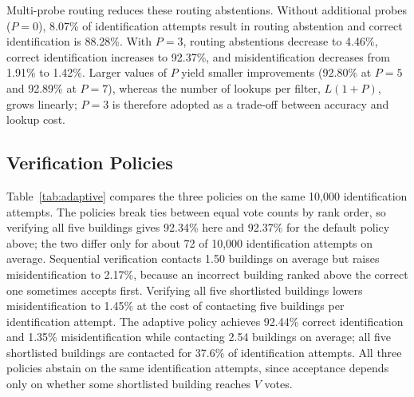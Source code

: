 \documentclass[pdflatex,sn-mathphys-num]{sn-jnl}%
\theoremstyle{thmstyleone}%
\theoremstyle{thmstyletwo}%
\theoremstyle{thmstylethree}%
\begin{document}
Multi-probe routing reduces these routing abstentions. Without additional probes ($P=0$), 8.07\% of identification attempts result in routing abstention and correct identification is 88.28\%. With $P=3$, routing abstentions decrease to 4.46\%, correct identification increases to 92.37\%, and misidentification decreases from 1.91\% to 1.42\%. Larger values of $P$ yield smaller improvements (92.80\% at $P=5$ and 92.89\% at $P=7$), whereas the number of lookups per filter, $L(1+P)$, grows linearly; $P=3$ is therefore adopted as a trade-off between accuracy and lookup cost.

\subsection{Verification Policies}

Table~\ref{tab:adaptive} compares the three policies on the same 10,000 identification attempts. The policies break ties between equal vote counts by rank order, so verifying all five buildings gives 92.34\% here and 92.37\% for the default policy above; the two differ only for about 72 of 10,000 identification attempts on average. Sequential verification contacts 1.50 buildings on average but raises misidentification to 2.17\%, because an incorrect building ranked above the correct one sometimes accepts first. Verifying all five shortlisted buildings lowers misidentification to 1.45\% at the cost of contacting five buildings per identification attempt. The adaptive policy achieves 92.44\% correct identification and 1.35\% misidentification while contacting 2.54 buildings on average; all five shortlisted buildings are contacted for 37.6\% of identification attempts. All three policies abstain on the same identification attempts, since acceptance depends only on whether some shortlisted building reaches $V$ votes.
\end{document}
